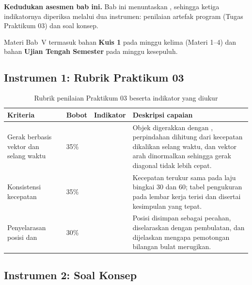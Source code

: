 \label{sec:asesmen-gerak}

\begin{asesmenbox}
\textbf{Kedudukan asesmen bab ini.} Bab ini menuntaskan ,
sehingga ketiga indikatornya diperiksa melalui dua instrumen: penilaian
artefak program (Tugas Praktikum 03) dan soal konsep.

\vspace{0.4em}
Materi Bab~V termasuk bahan \textbf{Kuis 1} pada minggu kelima (Materi 1--4)
dan bahan \textbf{Ujian Tengah Semester} pada minggu kesepuluh.
\end{asesmenbox}

\subsection*{Instrumen 1: Rubrik Praktikum 03}

\begin{table}[htbp]
\centering
\caption{Rubrik penilaian Praktikum 03 beserta indikator yang diukur}
\label{tab:rubrik-praktikum-03}
{\setlength{\tabcolsep}{4pt}\footnotesize%
\begin{tabularx}{\textwidth}{@{}L{3.2cm} C{1.3cm} C{2.1cm} Y@{}}
\toprule
\headrow \textbf{Kriteria} & \textbf{Bobot} & \textbf{Indikator} & \textbf{Deskripsi capaian} \\
\midrule
Gerak berbasis vektor dan selang waktu & 35\% &  &
Objek digerakkan dengan , perpindahan dihitung dari kecepatan
dikalikan selang waktu, dan vektor arah dinormalkan sehingga gerak diagonal
tidak lebih cepat. \\
\addlinespace
Konsistensi kecepatan & 35\% &  &
Kecepatan terukur sama pada laju bingkai 30 dan 60; tabel pengukuran pada
lembar kerja terisi dan disertai kesimpulan yang tepat. \\
\addlinespace
Penyelarasan posisi dan  & 30\% &  &
Posisi disimpan sebagai pecahan,  diselaraskan dengan pembulatan,
dan dijelaskan mengapa pemotongan bilangan bulat merugikan. \\
\bottomrule
\end{tabularx}}
\end{table}

\subsection*{Instrumen 2: Soal Konsep}

